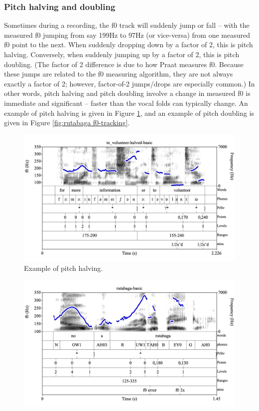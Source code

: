\documentclass[11pt, twoside]{memoir}
\begin{document}
{{{\subsubsection{Pitch halving and doubling}\label{sec:pitch-halving-and-doubling}
Sometimes during a recording, the f0 track will suddenly jump or fall – with the measured f0 jumping from say 199Hz to 97Hz (or vice-versa) from one measured f0 point to the next. When suddenly dropping down by a factor of 2, this is pitch halving. Conversely, when suddenly jumping up by a factor of 2, this is pitch doubling. (The factor of 2 difference is due to how Praat measures f0. Because these jumps are related to the f0 measuring algorithm, they are not always exactly a factor of 2; however, factor-of-2 jumps\slash drops are especially common.) 
In other words, pitch halving and pitch doubling involve a change in measured f0 is immediate and significant – faster than the vocal folds can typically change. An example of pitch halving is given in Figure \ref{fig:to volunteer-halved f0-tracking}, and an example of pitch doubling is given in Figure \ref{fig:rutabaga f0-tracking}.
\begin{figure}[H]
\centering
\includegraphics[width=.875\linewidth]{Appendix-to_volunteer-halved.png}
\caption{Example of pitch halving.
\label{fig:to volunteer-halved f0-tracking}
}
\end{figure}
\begin{figure}[H]
\centering
\includegraphics[width=.875\linewidth]{Contours-rutabaga-basic.png}

\end{figure}}}}
\end{document}
